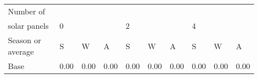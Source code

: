 \begin{table}[h] 
\centering 
\begin{tabular}{l|lll|lll|lll}Number of \\ solar panels&0& & &2& & &4& & \\ \hline 
Season or average & S & W & A & S & W & A & S & W & A \\ \hline 
Base&0.00&0.00&0.00&0.00&0.00&0.00&0.00&0.00&0.00 \\ 
\end{tabular} 
\end{table}